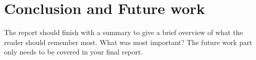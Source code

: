 \documentclass[conference,backref=page]{acmsiggraph}
\begin{document}
\section{Conclusion and Future work}
The report should finish with a summary to give a brief overview of what the reader should remember most.  What was most important? The future work part only needs to be covered in your final report.






\end{document}
